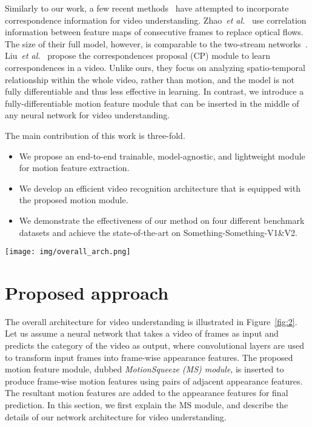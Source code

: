 \documentclass[runningheads]{llncs}
\begin{document}
Similarly to our work, a few recent methods~\cite{liu2019learning,zhao2018recognize} have attempted to incorporate correspondence information for video understanding.
Zhao~\emph{et al.}~\cite{zhao2018recognize} use correlation information between feature maps of consecutive frames to replace optical flows. The size of their full model, however, is comparable to the two-stream networks~\cite{simonyan2014two}.
Liu~\emph{et al.}~\cite{liu2019learning} propose the correspondences proposal (CP) module to learn correspondences in a video. 
Unlike ours, they focus on analyzing spatio-temporal relationship within the whole video, rather than motion, and the model is not fully differentiable and thus less effective in learning.
In contrast, we introduce a fully-differentiable motion feature module that can be inserted in the middle of any neural network for video understanding. 

The main contribution of this work is three-fold.
\begin{itemize}
\item We propose an end-to-end trainable, model-agnostic, and lightweight module for motion feature extraction. 
\item We develop an efficient video recognition architecture that is equipped with the proposed motion module.
\item We demonstrate the effectiveness of our method on four different benchmark datasets and achieve the state-of-the-art on Something-Something-V1\&V2.
\end{itemize}
 



\begin{figure*}[t]
    \centering
    \texttt{[image: img/overall\_arch.png]}
\caption{Overall architecture of the proposed approach. The model first takes  video frames as input and converts them into frame-wise appearance features using convolutional layers. The proposed \emph{MotionSqueeze (MS) module} generates motion features using the frame-wise appearance features, and combines the motion features into the next downstream layer.  denotes element-wise addition. 
} \label{fig:2}
\end{figure*}

\section{Proposed approach}
The overall architecture for video understanding is illustrated in Figure~\ref{fig:2}.
Let us assume a neural network that takes a video of  frames as input and predicts the category of the video as output, where convolutional layers are used to transform input frames into frame-wise appearance features. The proposed motion feature module, dubbed {\em MotionSqueeze (MS) module}, is inserted to produce frame-wise motion features using pairs of adjacent appearance features. The resultant motion features are added to the appearance features for final prediction.
In this section, we first explain the MS module, and describe the details of our network architecture for video understanding.
\end{document}
